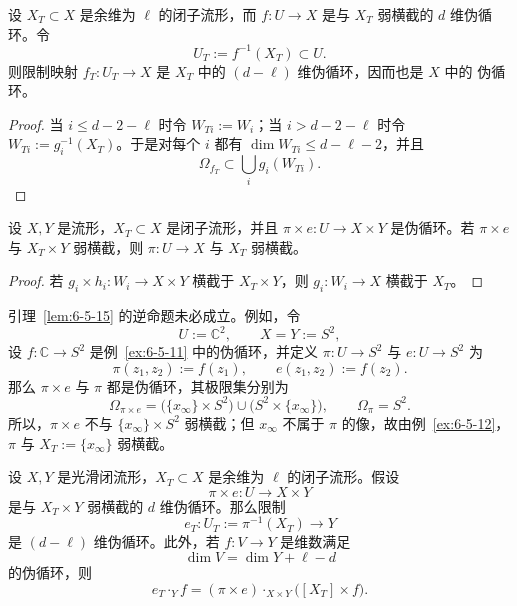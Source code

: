 \begin{lemma}\label{lem:6-5-14}
设 $X_T\subset X$ 是余维为 $\ell$ 的闭子流形，而 $f:U\to X$ 是与 $X_T$ 弱横截的
$d$ 维伪循环。令
\[
  U_T:=f^{-1}(X_T)\subset U.
\]
则限制映射 $f_T:U_T\to X$ 是 $X_T$ 中的 $(d-\ell)$ 维伪循环，因而也是 $X$ 中的
伪循环。
\end{lemma}

\begin{proof}
当 $i\le d-2-\ell$ 时令 $W_{Ti}:=W_i$；当 $i>d-2-\ell$ 时令
$W_{Ti}:=g_i^{-1}(X_T)$。于是对每个 $i$ 都有
$\dim W_{Ti}\le d-\ell-2$，并且
\[
  \Omega_{f_T}\subset\bigcup_i g_i(W_{Ti}).
\]
\end{proof}

\begin{lemma}\label{lem:6-5-15}
设 $X,Y$ 是流形，$X_T\subset X$ 是闭子流形，并且
$\pi\times e:U\to X\times Y$ 是伪循环。若 $\pi\times e$ 与
$X_T\times Y$ 弱横截，则 $\pi:U\to X$ 与 $X_T$ 弱横截。
\end{lemma}

\begin{proof}
若 $g_i\times h_i:W_i\to X\times Y$ 横截于 $X_T\times Y$，则
$g_i:W_i\to X$ 横截于 $X_T$。
\end{proof}

\begin{example}\label{ex:6-5-16}
引理~\ref{lem:6-5-15} 的逆命题未必成立。例如，令
\[
  U:=\mathbb C^2,\qquad X=Y:=S^2,
\]
设 $f:\mathbb C\to S^2$ 是例~\ref{ex:6-5-11} 中的伪循环，并定义
$\pi:U\to S^2$ 与 $e:U\to S^2$ 为
\[
  \pi(z_1,z_2):=f(z_1),\qquad e(z_1,z_2):=f(z_2).
\]
那么 $\pi\times e$ 与 $\pi$ 都是伪循环，其极限集分别为
\[
  \Omega_{\pi\times e}
  =\bigl(\{x_\infty\}\times S^2\bigr)
   \cup\bigl(S^2\times\{x_\infty\}\bigr),
  \qquad
  \Omega_\pi=S^2.
\]
所以，$\pi\times e$ 不与 $\{x_\infty\}\times S^2$ 弱横截；但
$x_\infty$ 不属于 $\pi$ 的像，故由例~\ref{ex:6-5-12}，$\pi$ 与
$X_T:=\{x_\infty\}$ 弱横截。
\end{example}

\begin{proposition}\label{prop:6-5-17}
设 $X,Y$ 是光滑闭流形，$X_T\subset X$ 是余维为 $\ell$ 的闭子流形。假设
\[
  \pi\times e:U\longrightarrow X\times Y
\]
是与 $X_T\times Y$ 弱横截的 $d$ 维伪循环。那么限制
\[
  e_T:U_T:=\pi^{-1}(X_T)\longrightarrow Y
\]
是 $(d-\ell)$ 维伪循环。此外，若 $f:V\to Y$ 是维数满足
\[
  \dim V=\dim Y+\ell-d
\]
的伪循环，则
\begin{equation}\label{eq:6-5-2}
  e_T\cdot_Y f
  =(\pi\times e)\cdot_{X\times Y}\bigl([X_T]\times f\bigr).
\end{equation}
\end{proposition}

